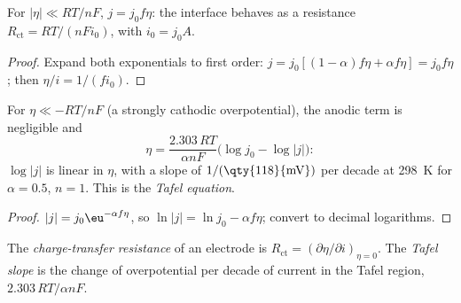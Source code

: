 \begin{corollary}\label{cor:b3:electrode-kinetics:linear}
For $|\eta| \ll RT/nF$, $j = j_0f\eta$: the interface behaves as a resistance
$R_{\mathrm{ct}} = RT/(nFi_0)$, with $i_0 = j_0A$.
\end{corollary}

\begin{proof}
Expand both exponentials to first order: $j = j_0[(1 - \alpha)f\eta + \alpha f\eta] = j_0f\eta$; then
$\eta/i = 1/(fi_0)$.
\end{proof}

\begin{corollary}\label{cor:b3:electrode-kinetics:tafel}
For $\eta \ll -RT/nF$ (a strongly cathodic overpotential), the anodic term is
negligible and
\[
  \eta = \frac{2.303\,RT}{\alpha nF}\bigl(\log j_0 - \log|j|\bigr):
\]
$\log|j|$ is linear in $\eta$, with a slope of $1/(\text{\qty{118}{mV}})$ per decade at \qty{298}{K} for $\alpha = 0.5$, $n =
1$. This is the \emph{Tafel equation}.
\end{corollary}

\begin{proof}
$|j| = j_0\eu^{-\alpha f\eta}$, so $\ln|j| = \ln j_0 - \alpha f\eta$; convert to decimal logarithms.
\end{proof}

\begin{definition}\label{def:b3:electrode-kinetics:charge-transfer}
The \emph{charge-transfer resistance} of an
electrode is $R_{\mathrm{ct}} = (\partial\eta/\partial i)_{\eta = 0}$. The \emph{Tafel slope}
is the change of overpotential per decade of current in the Tafel region,
$2.303\,RT/\alpha nF$.
\end{definition}


